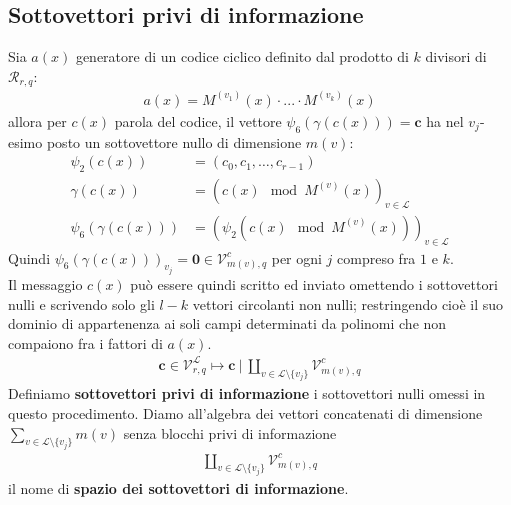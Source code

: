 \subsection{Sottovettori privi di informazione}
Sia $a(x)$ generatore di un codice ciclico definito dal prodotto di $k$ divisori di $\mathcal{R}_{r,q}$:
\begin{align*}
   a(x) = M^{(v_{1})}(x)\cdot ... \cdot M^{(v_{k})}(x)
\end{align*}
allora per $c(x)$ parola del codice, il vettore $\psi_{6}(\gamma (c(x))) = \mathbf{c}$ ha nel $v_{j}$-esimo posto un sottovettore nullo di dimensione $m(v)$:
\begin{align*}
   \psi_{2}(c(x)) &= (c_{0},c_{1}, \dots, c_{r-1}) \\
   \gamma(c(x)) &= ( c(x) \mod{M^{(v)} (x)} )_{v \in \mathscr{L} } \\
   \psi_{6}(\gamma (c(x))) &= (\psi_{2}(c(x) \mod{M^{(v)} (x)}))_{v \in \mathscr{L} }
\end{align*}
Quindi $\psi_{6}(\gamma (c(x)))_{v_{j}} = \mathbf{0} \in \mathcal{V}_{m(v), q}^{c}$ per ogni $j$ compreso fra $1$ e $k$.\\
Il messaggio $c(x)$ può essere quindi scritto ed inviato omettendo i sottovettori nulli e scrivendo solo gli $l - k$ vettori circolanti non nulli; restringendo cioè il suo dominio di appartenenza ai soli campi determinati da polinomi che non compaiono fra i fattori di $a(x)$.
\begin{align*}
   \mathbf{c} \in \mathcal{V}_{r, q}^{\mathscr{L}}
   \mapsto
   \mathbf{c} ~ \Bigg|~ \coprod_{v\in \mathscr{L} \setminus \lbrace v_{j}\rbrace} \mathcal{V}_{m(v), q}^{c}
\end{align*}
Definiamo {\bf sottovettori privi di informazione} i sottovettori nulli omessi in questo procedimento. Diamo all'algebra dei vettori concatenati di dimensione $\sum_{v\in \mathscr{L} \setminus \lbrace v_{j}\rbrace} m(v)$ senza blocchi privi di informazione
\begin{align*}
   \coprod_{v\in \mathscr{L} \setminus \lbrace v_{j}\rbrace} \mathcal{V}_{m(v), q}^{c}
\end{align*}
il nome di {\bf spazio dei sottovettori di informazione}.

